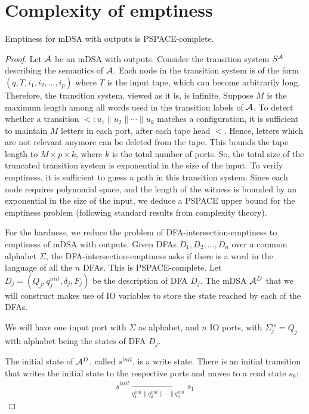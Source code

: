 \section{Complexity of emptiness}

\begin{theorem}
Emptiness for mDSA with outputs is PSPACE-complete.
\end{theorem}
\begin{proof}
    Let $\mathcal{A}$ be an mDSA with outputs. Consider the transition system $S^{\mathcal{A}}$ describing the semantics of $\mathcal{A}$. Each node in the transition system is of the form $(q, T, i_1, i_2, \dots, i_p)$ where $T$ is the input tape, which can become arbitrarily long. Therefore, the transition system, viewed as it is, is infinite. Suppose $M$ is the maximum length among all words used in the transition labels of $\mathcal{A}$. To detect whether a transition $\lt: u_1 \parallel u_2 \parallel \cdots \parallel u_k$ matches a configuration, it is sufficient to maintain $M$ letters in each port, after each tape head $\lt$. Hence, letters which are not relevant anymore can be deleted from the tape. This bounds the tape length to $M \times p \times k$, where $k$ is the total number of ports. So, the total size of the truncated transition system is exponential in the size of the input. To verify emptiness, it is sufficient to guess a path in this transition system. Since each node requires polynomial space, and the length of the witness is bounded by an exponential in the size of the input, we deduce a PSPACE upper bound for the emptiness problem (following standard results from complexity theory).

    For the hardness, we reduce the problem of DFA-intersection-emptiness  to emptiness of mDSA with outputs. Given DFAs $D_1, D_2, \dots, D_n$ over a common alphabet $\Sigma$, the DFA-intersection-emptiness asks if there is a word in the language of all the $n$ DFAs. This is PSPACE-complete. Let $D_j = (Q_j, q^{init}_j, \delta_j, F_j)$ be the description of DFA $D_j$. The mDSA $\mathcal{A}^D$ that we will construct makes use of IO variables to store the state reached by each of the DFAs.

    We will have one input port with $\Sigma$ as alphabet, and $n$ IO ports, with $\Sigma^{io}_j = Q_j$ with alphabet being the states of DFA $D_j$.

    The initial state of $\mathcal{A}^D$, called $s^{init}$, is a write state. There is an initial transition that writes the initial state to the respective ports and moves to  a read state $s_0$:
    \begin{align*}
    s^{init} \xrightarrow[q^{init}_1 \parallel q^{init}_2 \parallel \cdots \parallel q^{init}_n]{} s_1
    \end{align*}


\end{proof}
